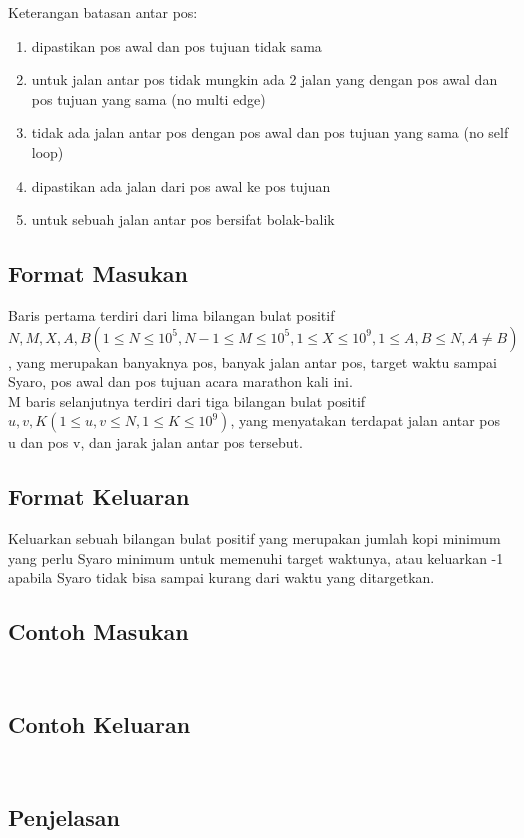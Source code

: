 \documentclass{article}
\begin{document}
Keterangan batasan antar pos:
\begin{enumerate}
    \item dipastikan pos awal dan pos tujuan tidak sama
    \item untuk jalan antar pos tidak mungkin ada 2 jalan yang dengan pos awal dan pos tujuan yang sama (no multi edge)
    \item tidak ada jalan antar pos dengan pos awal dan pos tujuan yang sama (no self loop)
    \item dipastikan ada jalan dari pos awal ke pos tujuan
    \item untuk sebuah jalan antar pos bersifat bolak-balik
\end{enumerate}

\subsection*{Format Masukan}

Baris pertama terdiri dari lima bilangan bulat positif $N, M, X, A, B (1 \leq N \leq 10^5, N-1 \leq M \leq 10^5, 1 \leq X \leq 10^9, 1 \leq A,B \leq N, A \neq B)$, yang merupakan banyaknya pos, banyak jalan antar pos, target waktu sampai Syaro, pos awal dan pos tujuan acara marathon kali ini.\\

M baris selanjutnya terdiri dari tiga bilangan bulat positif $u, v, K (1 \leq u, v \leq N, 1 \leq K \leq 10^9)$, yang menyatakan terdapat jalan antar pos u dan pos v, dan jarak jalan antar pos tersebut.

\subsection*{Format Keluaran}

Keluarkan sebuah bilangan bulat positif yang merupakan jumlah kopi minimum yang perlu Syaro minimum untuk memenuhi target waktunya, atau keluarkan -1 apabila Syaro tidak bisa sampai kurang dari waktu yang ditargetkan.

\begin{multicols}{2}
\subsection*{Contoh Masukan}
\begin{lstlisting}
    
\end{lstlisting}
\columnbreak
\subsection*{Contoh Keluaran}
\begin{lstlisting}
    
\end{lstlisting}
\vfill
\null
\end{multicols}

\subsection*{Penjelasan}
\end{document}
